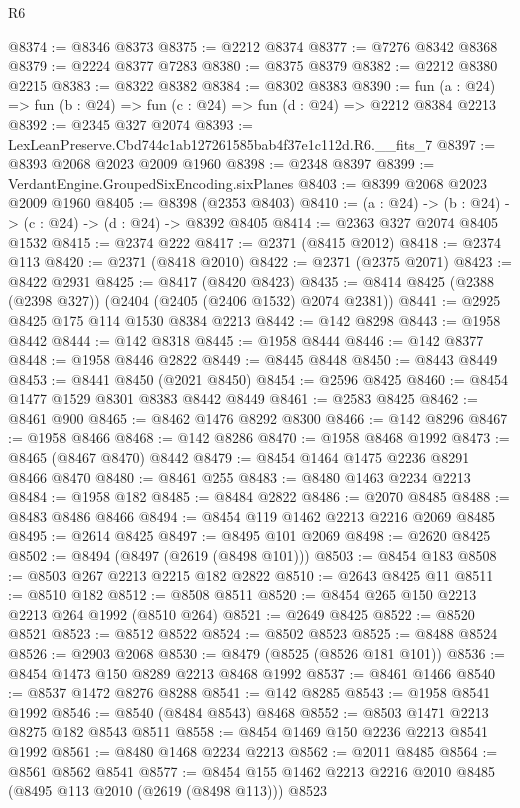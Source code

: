 \begin{lexlean}{R6}
\begin{coremodule}
@8374 := @8346 @8373
@8375 := @2212 @8374
@8377 := @7276 @8342 @8368
@8379 := @2224 @8377 @7283
@8380 := @8375 @8379
@8382 := @2212 @8380 @2215
@8383 := @8322 @8382
@8384 := @8302 @8383
@8390 := fun (a : @24) => fun (b : @24) => fun (c : @24) => fun (d : @24) => @2212 @8384 @2213
@8392 := @2345 @327 @2074
@8393 := LexLeanPreserve.Cbd744c1ab127261585bab4f37e1c112d.R6.__fits_7
@8397 := @8393 @2068 @2023 @2009 @1960
@8398 := @2348 @8397
@8399 := VerdantEngine.GroupedSixEncoding.sixPlanes
@8403 := @8399 @2068 @2023 @2009 @1960
@8405 := @8398 (@2353 @8403)
@8410 := (a : @24) -> (b : @24) -> (c : @24) -> (d : @24) -> @8392 @8405
@8414 := @2363 @327 @2074 @8405 @1532
@8415 := @2374 @222
@8417 := @2371 (@8415 @2012)
@8418 := @2374 @113
@8420 := @2371 (@8418 @2010)
@8422 := @2371 (@2375 @2071)
@8423 := @8422 @2931
@8425 := @8417 (@8420 @8423)
@8435 := @8414 @8425 (@2388 (@2398 @327)) (@2404 (@2405 (@2406 @1532) @2074 @2381))
@8441 := @2925 @8425 @175 @114 @1530 @8384 @2213
@8442 := @142 @8298
@8443 := @1958 @8442
@8444 := @142 @8318
@8445 := @1958 @8444
@8446 := @142 @8377
@8448 := @1958 @8446 @2822
@8449 := @8445 @8448
@8450 := @8443 @8449
@8453 := @8441 @8450 (@2021 @8450)
@8454 := @2596 @8425
@8460 := @8454 @1477 @1529 @8301 @8383 @8442 @8449
@8461 := @2583 @8425
@8462 := @8461 @900
@8465 := @8462 @1476 @8292 @8300
@8466 := @142 @8296
@8467 := @1958 @8466
@8468 := @142 @8286
@8470 := @1958 @8468 @1992
@8473 := @8465 (@8467 @8470) @8442
@8479 := @8454 @1464 @1475 @2236 @8291 @8466 @8470
@8480 := @8461 @255
@8483 := @8480 @1463 @2234 @2213
@8484 := @1958 @182
@8485 := @8484 @2822
@8486 := @2070 @8485
@8488 := @8483 @8486 @8466
@8494 := @8454 @119 @1462 @2213 @2216 @2069 @8485
@8495 := @2614 @8425
@8497 := @8495 @101 @2069
@8498 := @2620 @8425
@8502 := @8494 (@8497 (@2619 (@8498 @101)))
@8503 := @8454 @183
@8508 := @8503 @267 @2213 @2215 @182 @2822
@8510 := @2643 @8425 @11
@8511 := @8510 @182
@8512 := @8508 @8511
@8520 := @8454 @265 @150 @2213 @2213 @264 @1992 (@8510 @264)
@8521 := @2649 @8425
@8522 := @8520 @8521
@8523 := @8512 @8522
@8524 := @8502 @8523
@8525 := @8488 @8524
@8526 := @2903 @2068
@8530 := @8479 (@8525 (@8526 @181 @101))
@8536 := @8454 @1473 @150 @8289 @2213 @8468 @1992
@8537 := @8461 @1466
@8540 := @8537 @1472 @8276 @8288
@8541 := @142 @8285
@8543 := @1958 @8541 @1992
@8546 := @8540 (@8484 @8543) @8468
@8552 := @8503 @1471 @2213 @8275 @182 @8543 @8511
@8558 := @8454 @1469 @150 @2236 @2213 @8541 @1992
@8561 := @8480 @1468 @2234 @2213
@8562 := @2011 @8485
@8564 := @8561 @8562 @8541
@8577 := @8454 @155 @1462 @2213 @2216 @2010 @8485 (@8495 @113 @2010 (@2619 (@8498 @113))) @8523

\end{coremodule}
\end{lexlean}
